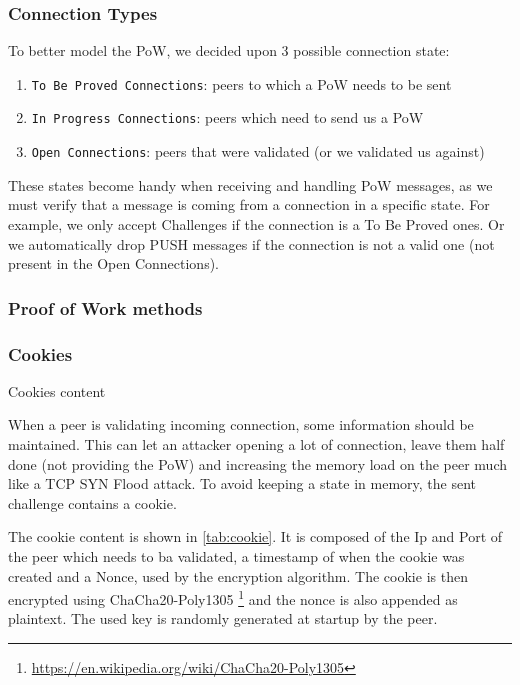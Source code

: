 \documentclass[a4paper,english,10pt,NET]{tumarticle}
\begin{document}
\subsubsection{Connection Types}

To better model the PoW, we decided upon 3 possible connection state:

\begin{enumerate}
	\item \texttt{To Be Proved Connections}: peers to which a PoW needs to be sent
	\item \texttt{In Progress Connections}: peers which need to send us a PoW
	\item \texttt{Open Connections}: peers that were validated (or we validated us against)
\end{enumerate}

These states become handy when receiving and handling PoW messages, as we must verify that a message is coming from a connection in a specific state. For example, we only accept Challenges if the connection is a To Be Proved ones. Or we automatically drop PUSH messages if the connection is not a valid one (not present in the Open Connections).

\subsubsection{Proof of Work methods}


\subsubsection{Cookies}

\begin{table}
	\centering
	
	\caption{Cookies content}
	\label{tab:cookie}
\end{table}

When a peer is validating incoming connection, some information should be maintained. This can let an attacker opening a lot of connection, leave them half done (not providing the PoW) and increasing the memory load on the peer much like a TCP SYN Flood attack. To avoid keeping a state in memory, the sent challenge contains a cookie. 

The cookie content is shown in \cref{tab:cookie}. It is composed of the Ip and Port of the peer which needs to ba validated, a timestamp of when the cookie was created and a Nonce, used by the encryption algorithm. The cookie is then encrypted using ChaCha20-Poly1305 \footnote{\url{https://en.wikipedia.org/wiki/ChaCha20-Poly1305}} and the nonce is also appended as plaintext. The used key is randomly generated at startup by the peer.
\end{document}
